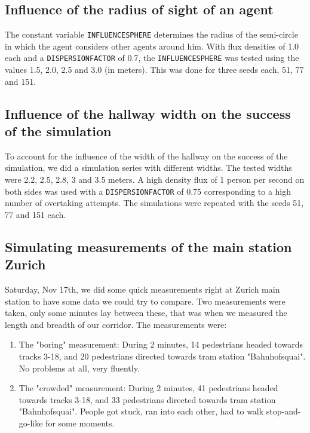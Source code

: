 \subsection{Influence of the radius of sight of an agent}
The constant variable \texttt{INFLUENCESPHERE} determines the radius of the semi-circle in which the agent considers other agents around him. With flux densities of 1.0 each and a \texttt{DISPERSIONFACTOR} of 0.7, the \texttt{INFLUENCESPHERE} was tested using the values 1.5, 2.0, 2.5 and 3.0 (in meters). This was done for three seeds each, 51, 77 and 151.

\subsection{Influence of the hallway width on the success of the simulation}
To account for the influence of the width of the hallway on the success of the simulation, we did a simulation series with different widths. The tested widths were 2.2, 2.5, 2.8, 3 and 3.5 meters. A high density flux of 1 person per second on both sides was used with a \texttt{DISPERSIONFACTOR} of 0.75 corresponding to a high number of overtaking attempts. The simulations were repeated with the seeds 51, 77 and 151 each.

\subsection{Simulating measurements of the main station Zurich}
Saturday, Nov 17th, we did some quick measurements right at Zurich main station to have some data we could try to compare. Two measurements were taken, only some minutes lay between these, that was when we measured the length and breadth of our corridor. The measurements were:
\begin{enumerate}
\item The "boring" measurement: During 2 minutes, 14 pedestrians headed towards tracks 3-18, and 20 pedestrians directed towards tram station "Bahnhofsquai". No problems at all, very fluently.
\item The "crowded" measurement: During 2 minutes, 41 pedestrians headed towards tracks 3-18, and 33 pedestrians directed towards tram station "Bahnhofsquai". People got stuck, ran into each other, had to walk stop-and-go-like for some moments.
\end{enumerate}

